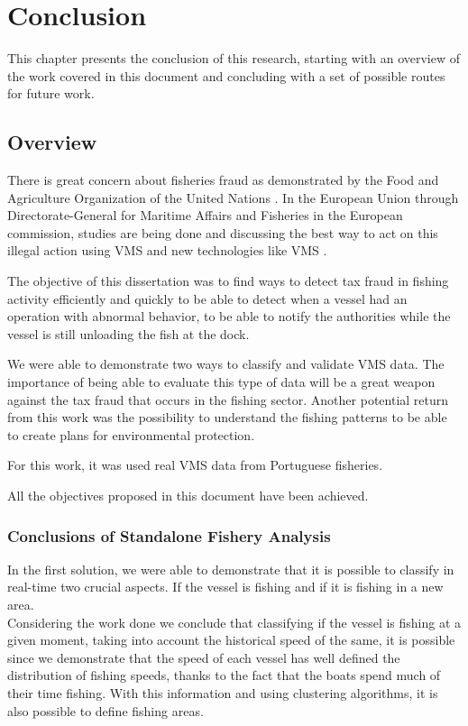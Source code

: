 % 
%  
%
\chapter{Conclusion}
\label{cha:conclusion}


This chapter presents the conclusion of this research, starting with an overview of the work covered in this document and concluding with a set of possible routes for future work.

\section{Overview} %
\label{sec:overview}

There is great concern about fisheries fraud as demonstrated by the Food and Agriculture Organization of the United Nations \cite{FAOFraud}.
In the European Union through Directorate-General for Maritime Affairs and Fisheries in the European commission, studies are being done and discussing the best way to act on this illegal action using VMS and new technologies like VMS \cite{WEBSITE:ECControl}.

The objective of this dissertation was to find ways to detect tax fraud in fishing activity efficiently and quickly to be able to detect when a vessel had an operation with abnormal behavior, to be able to notify the authorities while the vessel is still unloading the fish at the dock.

We were able to demonstrate two ways to classify and validate VMS data. The importance of being able to evaluate this type of data will be a great weapon against the tax fraud that occurs in the fishing sector. Another potential return from this work was the possibility to understand the fishing patterns to be able to create plans for environmental protection.

For this work, it was used real VMS data from Portuguese fisheries.

All the objectives proposed in this document have been achieved.

\subsection{Conclusions of Standalone Fishery Analysis} %
\label{sec:con_sfa}

In the first solution, we were able to demonstrate that it is possible to classify in real-time two crucial aspects. If the vessel is fishing and if it is fishing in a new area.\\
Considering the work done we conclude that classifying if the vessel is fishing at a given moment, taking into account the historical speed of the same, it is possible since we demonstrate that the speed of each vessel has well defined the distribution of fishing speeds, thanks to the fact that the boats spend much of their time fishing.
With this information and using clustering algorithms, it is also possible to define fishing areas.\\

